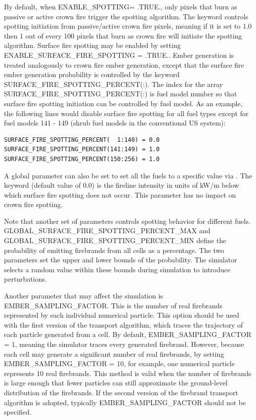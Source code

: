 By default, when ENABLE\_SPOTTING= .TRUE., only pixels that burn as passive or active crown fire trigger the spotting algorithm. The keyword  controls spotting initiation from passive/active crown fire pixels, meaning if it is set to 1.0 then 1 out of every 100 pixels that burn as crown fire will initiate the spotting algorithm. Surface fire spotting may be enabled by setting ENABLE\_SURFACE\_FIRE\_SPOTTING = .TRUE.. Ember generation is treated analogously to crown fire ember generation, except that the surface fire ember generation probability is controlled by the keyword SURFACE\_FIRE\_SPOTTING\_PERCENT(:). The index for the array SURFACE\_FIRE\_SPOTTING\_PERCENT(:) is fuel model number so that surface fire spotting initiation can be controlled by fuel model. As an example, the following lines would disable surface fire spotting for all fuel types except for fuel models 141 - 149 (shrub fuel models in the conventional US system):

\begin{verbatim}
SURFACE_FIRE_SPOTTING_PERCENT(  1:140) = 0.0
SURFACE_FIRE_SPOTTING_PERCENT(141:149) = 1.0
SURFACE_FIRE_SPOTTING_PERCENT(150:256) = 1.0
\end{verbatim}

A global parameter can also be set to set all the fuels to a specific value via . The keyword  (default value of 0.0) is the fireline intensity in units of kW/m below which surface fire spotting does not occur. This parameter has no impact on crown fire spotting.

Note that another set of parameters controls spotting behavior for different fuels. GLOBAL\_SURFACE\_FIRE\_SPOTTING\_PERCENT\_MAX and GLOBAL\_SURFACE\_FIRE\_SPOTTING\_PERCENT\_MIN define the probability of emitting firebrands from all cells as a percentage. The two parameters set the upper and lower bounds of the probability. The simulator selects a random value within these bounds during simulation to introduce perturbations.

Another parameter that may affect the simulation is EMBER\_SAMPLING\_FACTOR. This is the number of real firebrands represented by each individual numerical particle. This option should be used with the first version of the transport algorithm, which traces the trajectory of each particle generated from a cell. By default, EMBER\_SAMPLING\_FACTOR = 1, meaning the simulator traces every generated firebrand. However, because each cell may generate a significant number of real firebrands, by setting EMBER\_SAMPLING\_FACTOR = 10, for example, one numerical particle represents 10 real firebrands. This method is valid when the number of firebrands is large enough that fewer particles can still approximate the ground-level distribution of the firebrands. If the second version of the firebrand transport algorithm is adopted, typically EMBER\_SAMPLING\_FACTOR should not be specified.

